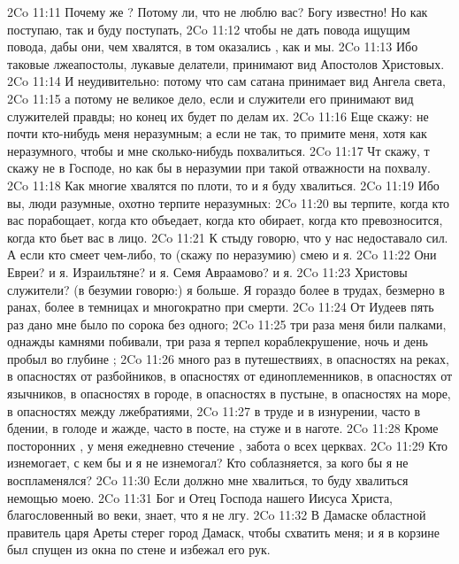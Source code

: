 \vs 2Co 11:11 Почему же ? Потому ли, что не люблю вас? Богу известно! Но как поступаю, так и буду поступать,
\vs 2Co 11:12 чтобы не дать повода ищущим повода, дабы они, чем хвалятся, в том оказались , как и мы.
\vs 2Co 11:13 Ибо таковые лжеапостолы, лукавые делатели, принимают вид Апостолов Христовых.
\vs 2Co 11:14 И неудивительно: потому что сам сатана принимает вид Ангела света,
\vs 2Co 11:15 а потому не великое дело, если и служители его принимают вид служителей правды; но конец их будет по делам их.
\rsbpar\vs 2Co 11:16 Еще скажу: не почти кто-нибудь меня неразумным; а если не так, то примите меня, хотя как неразумного, чтобы и мне сколько-нибудь похвалиться.
\vs 2Co 11:17 Чт скажу, т скажу не в Господе, но как бы в неразумии при такой отважности на похвалу.
\vs 2Co 11:18 Как многие хвалятся по плоти, то и я буду хвалиться.
\vs 2Co 11:19 Ибо вы, люди разумные, охотно терпите неразумных:
\vs 2Co 11:20 вы терпите, когда кто вас порабощает, когда кто объедает, когда кто обирает, когда кто превозносится, когда кто бьет вас в лицо.
\vs 2Co 11:21 К стыду говорю, что  у нас недоставало сил. А если кто смеет  чем-либо, то (скажу по неразумию) смею и я.
\vs 2Co 11:22 Они Евреи? и я. Израильтяне? и я. Семя Авраамово? и я.
\vs 2Co 11:23 Христовы служители? (в безумии говорю:) я больше. Я гораздо более  в трудах, безмерно в ранах, более в темницах и многократно при смерти.
\vs 2Co 11:24 От Иудеев пять раз дано мне было по сорока  без одного;
\vs 2Co 11:25 три раза меня били палками, однажды камнями побивали, три раза я терпел кораблекрушение, ночь и день пробыл во глубине ;
\vs 2Co 11:26 много раз  в путешествиях, в опасностях на реках, в опасностях от разбойников, в опасностях от единоплеменников, в опасностях от язычников, в опасностях в городе, в опасностях в пустыне, в опасностях на море, в опасностях между лжебратиями,
\vs 2Co 11:27 в труде и в изнурении, часто в бдении, в голоде и жажде, часто в посте, на стуже и в наготе.
\vs 2Co 11:28 Кроме посторонних , у меня ежедневно стечение , забота о всех церквах.
\vs 2Co 11:29 Кто изнемогает, с кем бы и я не изнемогал? Кто соблазняется, за кого бы я не воспламенялся?
\vs 2Co 11:30 Если должно мне хвалиться, то буду хвалиться немощью моею.
\vs 2Co 11:31 Бог и Отец Господа нашего Иисуса Христа, благословенный во веки, знает, что я не лгу.
\vs 2Co 11:32 В Дамаске областной правитель царя Ареты стерег город Дамаск, чтобы схватить меня; и я в корзине был спущен из окна по стене и избежал его рук.
